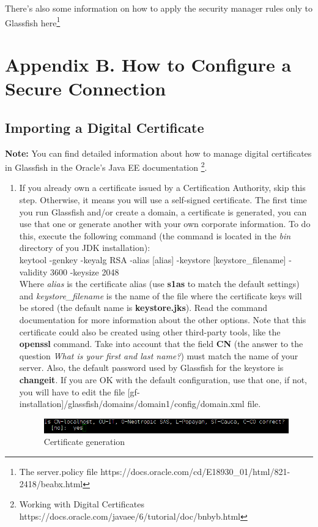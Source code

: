 \documentclass[a4paper]{article}
\begin{document}
\begin{appendices}
			There's also some information on how to apply the security manager rules only to Glassfish here\footnote{The server.policy file https://docs.oracle.com/cd/E18930\_01/html/821-2418/beabx.html}
			
			\newpage
			\appendix
			\section{Appendix B. How to Configure a Secure Connection} \label{app:AppendixB}
				\subsection{Importing a Digital Certificate}
				\textbf{Note:} You can find detailed information about how to manage digital certificates in Glassfish in the Oracle's Java EE documentation \footnote{Working with Digital Certificates https://docs.oracle.com/javaee/6/tutorial/doc/bnbyb.html}. \\
				
				\begin{enumerate}
					\item If you already own a certificate issued by a Certification Authority, skip this step. Otherwise, it means you will use a self-signed certificate. The first time you run Glassfish and/or create a domain, a certificate is generated, you can use that one or generate another with your own corporate information. To do this, execute the following command (the command is located in the \textit{bin} directory of you JDK installation):\\
					
					\small keytool -genkey -keyalg RSA -alias [alias] -keystore [keystore\_filename] -validity 3600 -keysize 2048\\
					
					Where \textit{alias} is the certificate alias (use \textbf{s1as} to match the default settings) and \textit{keystore\_filename} is the name of the file where the certificate keys will be stored (the default name is \textbf{keystore.jks}). Read the command documentation for more information about the other options. Note that this certificate could also be created using other third-party tools, like the \textbf{openssl} command. Take into account that the field \textbf{CN} (the answer to the question \textit{What is your first and last name?}) must match the name of your server. Also, the default password used by Glassfish for the keystore is \textbf{changeit}. If you are OK with the default configuration, use that one, if not, you will have to edit the file [gf-installation]/glassfish/domains/domain1/config/domain.xml file.
					\begin{figure}[h!]
						\centering
						\includegraphics[width=0.7\linewidth]{img/certificate_generation.png} 	
						\caption{Certificate generation}
						\label{fig:certificate_generation}
					\end{figure}
					

\end{enumerate}
\end{appendices}
\end{document}
